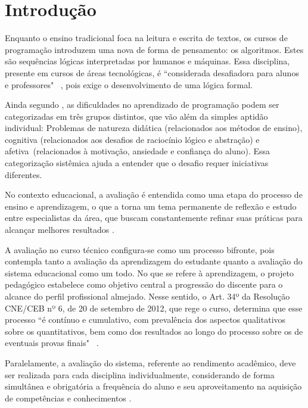 \chapter{Introdução}\label{cap:introducao}

Enquanto o ensino tradicional foca na leitura e escrita de 
textos, os cursos de programação introduzem uma nova de forma de 
pensamento: os algoritmos. Estes são sequências lógicas 
interpretadas por humanos e máquinas. Essa disciplina, 
presente em cursos de áreas tecnológicas, é ``considerada 
desafiadora para alunos e professores"~ \cite{raabe2005ambiente}, 
pois exige o desenvolvimento de uma lógica formal.

Ainda segundo \cite{raabe2005ambiente}, as dificuldades no 
aprendizado de programação podem ser categorizadas em três grupos 
distintos, que vão além da simples aptidão individual: Problemas 
de natureza didática (relacionados aos métodos de ensino), 
cognitiva (relacionados aos desafios de raciocínio lógico e  
abstração) e afetiva~(relacionados à motivação, ansiedade e 
confiança do aluno). Essa categorização sistêmica ajuda a 
entender que o desafio requer iniciativas diferentes.  

No contexto educacional, a avaliação é entendida como uma etapa 
do processo de ensino e aprendizagem, o que a torna um tema 
permanente de reflexão e estudo entre especialistas da área, que 
buscam constantemente refinar suas práticas para alcançar 
melhores resultados \cite{lima2022avaliaccao}.

A avaliação no curso técnico configura-se como um processo 
bifronte, pois contempla tanto a avaliação da aprendizagem do 
estudante quanto a avaliação do sistema educacional como um todo. 
No que se refere à aprendizagem, o projeto pedagógico estabelece 
como objetivo central a progressão do discente para o 
alcance do perfil profissional almejado. Nesse sentido, o Art. 
34º da Resolução CNE/CEB nº 6, de 20 de setembro de 2012, que 
rege o curso, determina que esse processo ``é contínuo e 
cumulativo, com prevalência dos aspectos qualitativos 
sobre os quantitativos, bem como dos resultados ao longo do 
processo sobre os de eventuais provas finais" ~\cite{IFAM2020}.

Paralelamente, a avaliação do sistema, referente ao rendimento 
acadêmico, deve ser realizada para cada disciplina 
individualmente, considerando de forma simultânea e obrigatória a 
frequência do aluno e seu aproveitamento na aquisição de 
competências e conhecimentos \cite{IFAM2020}.

